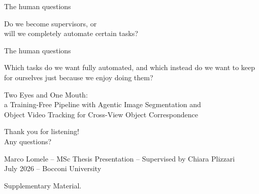 \documentclass[professionalfonts,aspectratio=169]{beamer}
\begin{document}
\begin{frame}[t]
\begin{center}
{\large The human questions}
\end{center}
\vfill
\begin{center}
{\Large Do we become supervisors, or \\ will we completely automate certain tasks?}
\end{center}
\vfill
\end{frame}

\begin{frame}[t]
\begin{center}
{\large The human questions}
\end{center}
\vfill
\begin{center}
{\Large Which tasks do we want fully automated, and which instead do we want to keep for ourselves just because we enjoy doing them?}
\end{center}
\vfill
\end{frame}

\begin{frame}[plain]
\begin{center}
{\color{gray!90}
{\normalsize Two Eyes and One Mouth: \\ a Training-Free Pipeline with Agentic Image Segmentation and \\ Object Video Tracking for Cross-View Object Correspondence}}
\end{center}
\vfill
\begin{center}
{\Large Thank you for listening!} \\[0.8em]
{\large Any questions?}
\end{center}
\vfill
\begin{center}
{\color{gray!90}
{\normalsize Marco Lomele -- MSc Thesis Presentation -- Supervised by Chiara Plizzari \\ July 2026 -- Bocconi University}}
\end{center}
\end{frame}

\begin{frame}[plain]
\begin{center}
    \vfill
    {\Large Supplementary Material.}
    \vfill
\end{center}
\end{frame}

\end{document}
